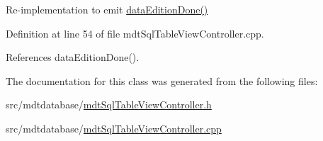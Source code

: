 Re-\/implementation to emit \hyperlink{classmdt_sql_table_view_controller_item_delegate_a3967fd8b9766b30703e135af36f3bbbd}{data\-Edition\-Done()} 



Definition at line 54 of file mdt\-Sql\-Table\-View\-Controller.\-cpp.



References data\-Edition\-Done().



The documentation for this class was generated from the following files\-:\begin{DoxyCompactItemize}
\item 
src/mdtdatabase/\hyperlink{mdt_sql_table_view_controller_8h}{mdt\-Sql\-Table\-View\-Controller.\-h}\item 
src/mdtdatabase/\hyperlink{mdt_sql_table_view_controller_8cpp}{mdt\-Sql\-Table\-View\-Controller.\-cpp}\end{DoxyCompactItemize}
